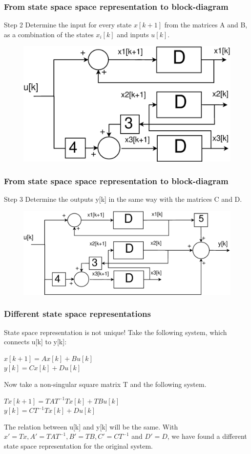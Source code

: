 \begin{frame}
	\frametitle{From state space space representation to block-diagram}
	\begin{block}{Step 2}
		Determine the input for every state $x[k+1]$ from the matrices A and B, as a combination of the states $x_i[k]$ and inputs $u[k]$.
		\begin{figure}
			\centering
			\includegraphics[width=0.5\linewidth]{Images/Discrete_time_eps_12.eps}
		\end{figure}
	\end{block}
\end{frame}
\begin{frame}
	\frametitle{From state space space representation to block-diagram}
	\begin{block}{Step 3}
		Determine the outputs y[k] in the same way with the matrices C and D.
			\begin{figure}
				\centering
				\includegraphics[width=0.7\linewidth]{Images/Discrete_time_eps_13.eps}
			\end{figure}
	\end{block}
\end{frame}
\begin{frame}
	\frametitle{Different state space representations}
	\begin{alertblock}{State space representation is not unique!}
		Take the following system, which connects u[k] to y[k]:
		\begin{center}
			$x[k+1] = A x[k] + B u[k]$ \\
			$y[k] = C x[k] + D u[k] $ 
		\end{center}
		Now take a non-singular square matrix T and the following system. 	
		\begin{center}
			$Tx[k+1] = TAT^{-1}Tx[k] + TBu[k]$\\
			$y[k] = C T^{-1}Tx[k] + Du[k]$
		\end{center}
		The relation between u[k] and y[k] will be the same.
		With $x' = Tx, A' = TAT^{-1},B' = TB,C' = CT^{-1}$ and $D'=D$,  we have found a different state space representation for the original system.
		
	\end{alertblock}
\end{frame}
